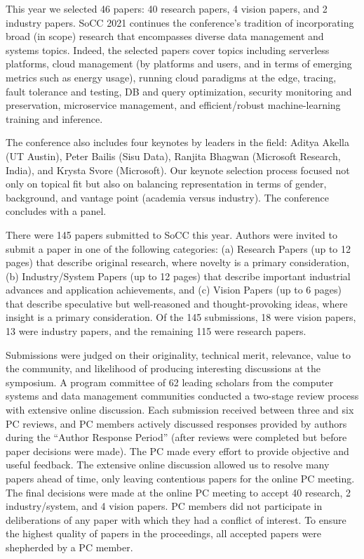 This year we selected 46 papers: 40 research papers, 4 vision papers, and  2 industry papers. SoCC 2021 continues the conference's tradition of incorporating broad (in scope) research that encompasses diverse data management and systems topics. Indeed, the selected papers cover topics including serverless platforms, cloud management (by platforms and users, and in terms of emerging metrics such as energy usage), running cloud paradigms at the edge, tracing, fault tolerance and testing, DB and query optimization, security monitoring and preservation, microservice management, and efficient/robust machine-learning training and inference.

The conference also includes four keynotes by leaders in the field: Aditya Akella (UT Austin), Peter Bailis (Sisu Data), Ranjita Bhagwan (Microsoft Research, India), and Krysta Svore (Microsoft). Our keynote selection process focused not only on topical fit but also on balancing representation in terms of gender, background, and vantage point (academia versus industry). The conference concludes with a panel.

There were 145 papers submitted to SoCC this year. Authors were invited to submit a paper in one of the following categories: (a) Research Papers (up to 12 pages) that describe original research, where novelty is a primary consideration, (b) Industry/System Papers (up to 12 pages) that describe important industrial advances and application achievements, and (c) Vision Papers (up to 6 pages) that describe speculative but well-reasoned and thought-provoking ideas, where insight is a primary consideration. Of the 145 submissions, 18 were vision papers, 13 were industry papers, and the remaining 115 were research papers.

Submissions were judged on their originality, technical merit, relevance, value to the community, and likelihood of producing interesting discussions at the symposium.  A program committee of 62 leading scholars from the computer systems and data management communities conducted a two-stage review process with extensive online discussion. Each submission received between three and six PC reviews, and PC members actively discussed responses provided by authors during the ``Author Response Period'' (after reviews were completed but before paper decisions were made). The PC made every effort to provide objective and useful feedback. The extensive online discussion allowed us to resolve many papers ahead of time, only leaving contentious papers for the online PC meeting. The final decisions were made at the online PC meeting to accept 40 research, 2 industry/system, and 4 vision papers. PC members did not participate in deliberations of any paper with which they had a conflict of interest. To ensure the highest quality of papers in the proceedings, all accepted papers were shepherded by a PC member.

